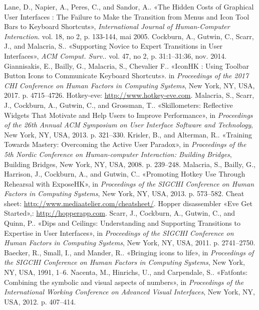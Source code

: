 \documentclass[12pt,a4paper]{article}
\begin{document}
\begin{thebibliography}{20}
 Lane, D., Napier, A., Peres, C., and Sandor, A.. «The Hidden Costs of Graphical User Interfaces : The Failure to Make the Transition from Menus and Icon Tool Bars to Keyboard Shortcuts», \textit{International Journal of Human-Computer Interaction}. vol. 18, no 2, p. 133-144,
mai 2005.
 Cockburn, A., Gutwin, C., Scarr, J., and Malacria, S.. «Supporting Novice to Expert Transitions in User Interfaces», \textit{ACM Comput. Surv.}. vol. 47, no 2, p. 31:1–31:36, nov. 2014.
 Giannisakis, E., Bailly, G., Malacria, S., Chevalier F.. «IconHK : Using Toolbar Button Icons to Communicate Keyboard Shortcuts». in \textit{Proceedings of the 2017 CHI Conference on Human Factors in Computing Systems}, New York, NY, USA, 2017. p. 4715–4726.
 Hotkey-eve: \href{http://www.hotkey-eve.com}{http://www.hotkey-eve.com}.
 Malacria, S., Scarr, J., Cockburn, A., Gutwin, C., and Grossman, T.. «Skillometers: Reflective Widgets That Motivate and Help Users to Improve Performance», in \textit{Proceedings of the 26th Annual ACM Symposium on User Interface Software and Technology}, New York, NY, USA, 2013. p. 321–330.
 Krisler, B., and Alterman, R.. «Training Towards Mastery: Overcoming the Active User Paradox», in \textit{Proceedings of the 5th Nordic Conference on Human-computer Interaction: Building Bridges}, Building Bridges, New York, NY, USA, 2008. p. 239–248.
 Malacria, S., Bailly, G., Harrison, J., Cockburn, A., and Gutwin, C.. «Promoting Hotkey Use Through Rehearsal with ExposeHK», in \textit{Proceedings of the SIGCHI Conference on Human Factors in Computing Systems}, New York, NY, USA, 2013. p. 573–582.
 Cheat sheet: \href{http://www.mediaatelier.com/cheatsheet/}{http://www.mediaatelier.com/cheatsheet/}.
 Hopper disassembler «Eve Get Started»,: \href{http://hopperapp.com}{http://hopperapp.com}.
 Scarr, J., Cockburn, A., Gutwin, C., and Quinn, P.. «Dips and Ceilings: Understanding and
Supporting Transitions to Expertise in User Interfaces», in \textit{Proceedings of the SIGCHI Conference on Human Factors in Computing Systems}, New York, NY, USA, 2011. p. 2741–2750.
 Baecker, R., Small, I., and Mander, R.. «Bringing icons to life», in \textit{Proceedings of the SIGCHI Conference on Human Factors in Computing Systems}, New York, NY, USA, 1991, 1–6.
 Nacenta, M., Hinrichs, U., and Carpendale, S.. «Fatfonts: Combining the symbolic and visual aspects of numbers», in \textit{Proceedings of the International Working Conference on Advanced Visual Interfaces}, New York, NY, USA, 2012. p. 407–414.

\end{thebibliography}
\end{document}
